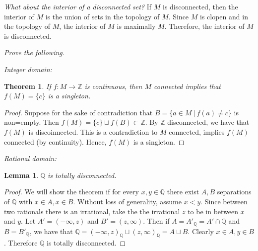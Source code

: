 \documentclass[letter]{article}
\newtheorem{theorem}{Theorem}
\newtheorem{lemma}{Lemma}
\newenvironment{menumerate}{%
  \edef\backupindent{\the\parindent}%
  \enumerate%
  \setlength{\parindent}{\backupindent}%
}{\endenumerate}
\begin{document}
\begin{menumerate}
\begin{menumerate}
		\item \emph{What about the interior of a disconnected set?} If $M$ is disconnected, then the interior of $M$ is the union of sets in the topology of $M.$ Since $M$ is clopen and in the topology of $M$, the interior of $M$ is maximally $M.$ Therefore, the interior of $M$ is disconnected. 
		\end{menumerate}
	\setcounter{enumi}{58}
	\item 
	\item \emph{Prove the following.}
		\begin{menumerate}
			\item \emph{Integer domain:}
				\begin{theorem}
					If $f: M \to \mathbb{Z}$ is continuous, then $M$ connected implies that $f(M) = \{c\}$ is a singleton.
				\end{theorem}
				\begin{proof}
					Suppose for the sake of contradiction that $B = \{a \in M\ |\ f(a) \neq c\}$ is non=empty.
					Then $f(M) = \{c\} \sqcup f(B) \subset \mathbb{Z}.$ By $\mathbb{Z}$ disconnected, we have that $f(M)$ is discoinnected. This is a contradiction to $M$ connected, implies $f(M)$ connected (by continuity). Hence, $f(M)$ is a singleton.
				\end{proof}
			\item \emph{Rational domain:}
				\begin{lemma}
					$\mathbb{Q}$ is totally disconnected.
				\end{lemma}
				\begin{proof}
					We will show the theorem if for every $x,y \in \mathbb{Q}$ there exist $A,B$ separations of $\mathbb{Q}$ with $x\in A, x \in B$. Without loss of generality, assume $x < y.$ Since between two rationals there is an irrational, take the the irrational $z$ to be in between $x$ and $y$. Let $A' = (-\infty, z)$ and $B' = (z, \infty).$ Then if $A = A'_\mathbb{Q} = A' \cap \mathbb{Q}$ and $B = B'_\mathbb{Q}$, we have that $\mathbb{Q} = (-\infty,z)_\mathbb{Q} \sqcup (z, \infty)_\mathbb{Q} = A \sqcup B.$ Clearly $x \in A, y \in B$. Therefore $\mathbb{Q}$ is totally disconnected.
				\end{proof}


\end{menumerate}
\end{menumerate}
\end{document}
